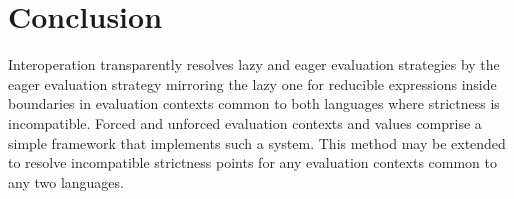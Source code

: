 \section{Conclusion}

Interoperation transparently resolves lazy and eager evaluation strategies by the eager evaluation strategy mirroring the lazy one for reducible expressions inside boundaries in evaluation contexts common to both languages where strictness is incompatible. Forced and unforced evaluation contexts and values comprise a simple framework that implements such a system. This method may be extended to resolve incompatible strictness points for any evaluation contexts common to any two languages.